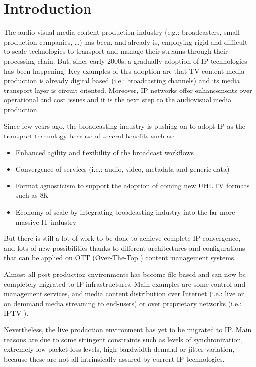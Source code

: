\cleardoublepage
{}
\chapter*{Introduction}
 
The audio-visual media content production industry (e.g.: broadcasters, small production companies, \ldots) has been, and already is, employing rigid and difficult to scale technologies to transport and manage their streams through their processing chain. But, since early 2000s, a gradually adoption of IP technologies has been happening. Key examples of this adoption are that TV content media production is already digital based (i.e.: broadcasting channels) and its media transport layer is circuit oriented. Moreover, IP networks offer enhancements over operational and cost issues and it is the next step to the audiovisual media production.

Since few years ago, the broadcasting industry is pushing on to adopt IP as the transport technology because of several benefits such as:

\begin{itemize}
  \item Enhanced agility and flexibility of the broadcast workflows
  \item Convergence of services (i.e.: audio, video, metadata and generic data)
  \item Format agnosticism to support the adoption of coming new UHDTV formats such as 8K 
  \item Economy of scale by integrating broadcasting industry into the far more massive IT industry
\end{itemize}

But there is still a lot of work to be done to achieve complete IP convergence, and lots of new possibilities thanks to different architectures and configurations that can be applied on OTT (Over-The-Top \cite{ottVSiptv}) content management systems. 

Almost all post-production environments has become file-based and can now be completely migrated to IP infrastructures. Main examples are some control and management services, and media content distribution over Internet (i.e.: live or on demmand media streaming to end-users) or over proprietary networks (i.e.: IPTV \cite{ottVSiptv}).

Nevertheless, the live production environment has yet to be migrated to IP. Main reasons are due to some stringent constraints such as levels of synchronization, extremely low packet loss levels, high-bandwidth demand or jitter variation, because these are not all intrinsically assured by current IP technologies.

